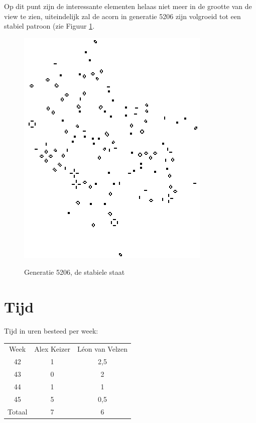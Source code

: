 \documentclass[10pt]{article}
\begin{document}
Op dit punt zijn de interessante elementen helaas niet meer in de grootte van de view te zien, uiteindelijk zal de acorn in generatie 5206 zijn volgroeid tot een stabiel patroon (zie Figuur \ref{fig:final}.

\begin{figure}[!ht]
\begin{center}
{\includegraphics[scale=0.5]{Acorn_final.png}}
\caption{Generatie 5206, de stabiele staat \cite{acorn}}\label{fig:final}
\end{center}
\end{figure}

\newpage

\section{Tijd}

Tijd in uren besteed per week:

\begin{center}
\begin{tabular}{ |c|c|c| }
\hline
Week & Alex Keizer & L\'{e}on van Velzen \\
42 & 1 & 2,5 \\
43 & 0 & 2 \\
44 & 1 & 1 \\
45 & 5 & 0,5 \\ 
\hline
Totaal & 7 & 6 \\
\hline
\end{tabular}
\end{center}
\end{document}
